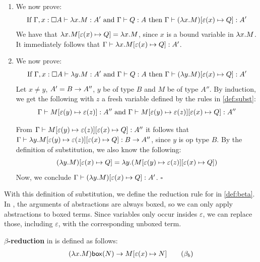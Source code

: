 \begin{proofthm}
\begin{enumerate}
    \item%
 We now prove:
    \[
 \mbox{If } \hspace{0.0em} {\Gamma, x : \square{A}} \vdash {\lambda{x}.{M} : A'} \hspace{0.0em} \mbox{ and } \hspace{0.0em} {\Gamma} \vdash {Q : A} \hspace{0.0em} \mbox{ then } \hspace{0.0em} {\Gamma} \vdash {(\lambda{x}.{M})  [{\varepsilon(x)}\mapsto{Q}]  : A'} \hspace{0.0em}
    \]
 We have that $\lambda {x}.{M} [{\varepsilon(x)}\mapsto{Q}] = \lambda {x}.{M}$, since $x$ is a bound variable in $\lambda {x}.{M}$.
 It immediately follows that $\hspace{0.0em} {\Gamma} \vdash {\lambda{x}.{M}  [{\varepsilon(x)}\mapsto{Q}]  : A'} \hspace{0.0em}$.
    \item%
 We now prove:
    \[
 \mbox{If } \hspace{0.0em} {\Gamma, x : \square{A}} \vdash {\lambda{y}.{M} : A'} \hspace{0.0em} \mbox{ and } \hspace{0.0em} {\Gamma} \vdash {Q : A} \hspace{0.0em} \mbox{ then } \hspace{0.0em} {\Gamma} \vdash {(\lambda{y}.{M})  [{\varepsilon(x)}\mapsto{Q}]  : A'} \hspace{0.0em}
    \]
 Let $x \neq y$, $A' = B \to A''$, $y$ be of type $B$ and $M$ be of type $A''$.
 By induction, we get the following with $z$ a fresh variable defined by the rules in \cref{def:subst}:
    \[
 \hspace{0.0em} {\Gamma} \vdash {M  [{\varepsilon(y)}\mapsto{\varepsilon(z)}]  : A''} \hspace{0.0em} \mbox{ and } \hspace{0.0em} {\Gamma} \vdash {M  [{\varepsilon(y)}\mapsto{\varepsilon(z)}]  [{\varepsilon(x)}\mapsto{Q}]  : A''} \hspace{0.0em}
    \]

 From $\hspace{0.0em} {\Gamma} \vdash {M  [{\varepsilon(y)}\mapsto{\varepsilon(z)}]  [{\varepsilon(x)}\mapsto{Q}]  : A''} \hspace{0.0em}$ it follows that \\
    $\hspace{0.0em} {\Gamma} \vdash {\lambda{y}.{M}  [{\varepsilon(y)}\mapsto{\varepsilon(z)}]  [{\varepsilon(x)}\mapsto{Q}]  : B \to A''} \hspace{0.0em}$, since $y$ is op type $B$.
 By the definition of substitution, we also know the following: 
  \[
    (\lambda {y}.{M}) [{\varepsilon(x)}\mapsto{Q}] = \lambda {y}.{(M [{\varepsilon(y)}\mapsto{\varepsilon(z)}][{\varepsilon(x)}\mapsto{Q}])}
  \] 
  Now, we conclude $\hspace{0.0em} {\Gamma} \vdash {(\lambda{y}.{M})  [{\varepsilon(x)}\mapsto{Q}]  : A'} \hspace{0.0em}$. $\square$
  \end{enumerate}
\end{proofthm}

With this definition of substitution, we define the reduction rule for \lab in \cref{def:beta}.
In \lab, the arguments of abstractions are always boxed, so we can only apply abstractions to boxed terms.
Since variables only occur insides $\varepsilon$, we can replace those, including $\varepsilon$, with the corresponding unboxed term.

\begin{definition}
  \label{def:beta}
  \textbf{\boldmath${\beta}$-reduction} in \lab is defined as follows:
  \begin{align*}
 (\lambda {x}.{M})\mathsf{box}({N}) \to M [{\varepsilon(x)}\mapsto{N}] \quad \quad (\beta_b)
  \end{align*}
\end{definition}

